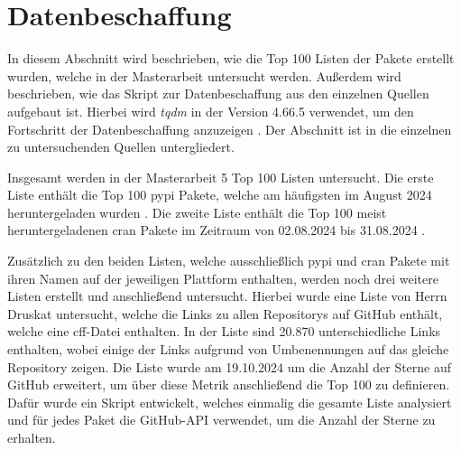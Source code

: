 \section{Datenbeschaffung}
\label{sec:datenbeschaffung}
In diesem Abschnitt wird beschrieben, wie die Top 100 Listen der Pakete erstellt wurden, welche in der Masterarbeit untersucht werden.
Außerdem wird beschrieben, wie das Skript zur Datenbeschaffung aus den einzelnen Quellen aufgebaut ist.
Hierbei wird \emph{tqdm} in der Version 4.66.5 verwendet, um den Fortschritt der Datenbeschaffung anzuzeigen \autocite{costa-luis_tqdm_2024}.
Der Abschnitt ist in die einzelnen zu untersuchenden Quellen untergliedert.

Insgesamt werden in der Masterarbeit 5 Top 100 Listen untersucht.
Die erste Liste enthält die Top 100 \gls{pypi} Pakete, welche am häufigsten im August 2024 heruntergeladen wurden \autocite{kemenade_hugovktop-pypi-packages_2024}.
Die zweite Liste enthält die Top 100 meist heruntergeladenen \gls{cran} Pakete im Zeitraum von 02.08.2024 bis 31.08.2024 \autocite{csardi_r-hubcranlogsapp_2024}.

Zusätzlich zu den beiden Listen, welche ausschließlich \gls{pypi} und \gls{cran} Pakete mit ihren Namen auf der jeweiligen Plattform enthalten, werden noch drei weitere Listen erstellt und anschließend untersucht.
Hierbei wurde eine Liste von Herrn Druskat untersucht, welche die Links zu allen Repositorys auf GitHub enthält, welche eine \gls{cff}-Datei enthalten.
In der Liste sind 20.870 unterschiedliche Links enthalten, wobei einige der Links aufgrund von Umbenennungen auf das gleiche Repository zeigen.
Die Liste wurde am 19.10.2024 um die Anzahl der Sterne auf GitHub erweitert, um über diese Metrik anschließend die Top 100 zu definieren.
Dafür wurde ein Skript entwickelt, welches einmalig die gesamte Liste analysiert und für jedes Paket die GitHub-API verwendet, um die Anzahl der Sterne zu erhalten.

